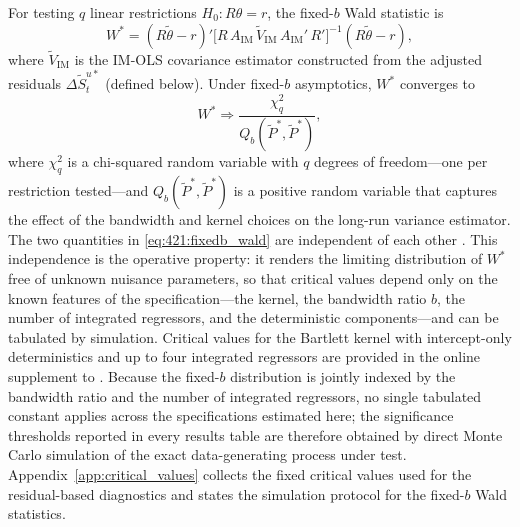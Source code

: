 For testing $q$ linear restrictions $H_0: R\theta = r$, the
fixed-$b$ Wald statistic is
\begin{equation}
	W^{*} = (R\tilde{\theta} - r)'
	\bigl[R\, A_{\text{IM}}\, \tilde{V}_{\text{IM}}\,
	A_{\text{IM}}'\, R'\bigr]^{-1}
	(R\tilde{\theta} - r),
	\label{eq:421:fixedb_wald_stat}
\end{equation}
where $\tilde{V}_{\text{IM}}$ is the IM-OLS covariance estimator
constructed from the adjusted residuals
$\Delta\tilde{S}^{u*}_t$ (defined below). Under fixed-$b$
asymptotics, $W^{*}$ converges to
\begin{equation}
	W^{*} \Rightarrow \frac{\chi^2_q}{Q_b(\tilde{P}^{*},
		\tilde{P}^{*})},
	\label{eq:421:fixedb_wald}
\end{equation}
where $\chi^2_q$ is a chi-squared random variable with $q$
degrees of freedom---one per restriction tested---and
$Q_b(\tilde{P}^{*}, \tilde{P}^{*})$ is a positive random
variable that captures the effect of the bandwidth and kernel
choices on the long-run variance estimator. The two quantities
in \eqref{eq:421:fixedb_wald} are independent of each other
\citep[Lemma 2, Proposition 3]{VogelsangWagner2014}. This
independence is the operative property: it renders the limiting
distribution of $W^{*}$ free of unknown nuisance parameters, so
that critical values depend only on the known features of the
specification---the kernel, the bandwidth ratio $b$, the number
of integrated regressors, and the deterministic components---and
can be tabulated by simulation. Critical values for the Bartlett
kernel with intercept-only deterministics and up to four
integrated regressors are provided in the online supplement to
\citet{VogelsangWagner2014}. Because the fixed-$b$ distribution is
jointly indexed by the bandwidth ratio and the number of integrated
regressors, no single tabulated constant applies across the
specifications estimated here; the significance thresholds reported
in every results table are therefore obtained by direct Monte Carlo
simulation of the exact data-generating process under test.
Appendix~\ref{app:critical_values} collects the fixed critical
values used for the residual-based diagnostics and states the
simulation protocol for the fixed-$b$ Wald statistics.

